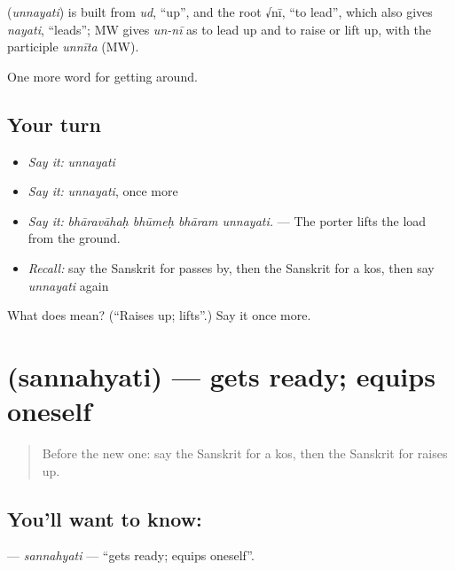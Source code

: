 \begin{cousinweb}
\textbf{} (\emph{unnayati}) is built from \emph{ud}, \textquotedblleft{}up\textquotedblright{}, and the root √nī, \textquotedblleft{}to lead\textquotedblright{}, which also gives \emph{nayati}, \textquotedblleft{}leads\textquotedblright{}; MW gives \emph{un-nī} as to lead up and to raise or lift up, with the participle \emph{unnīta} (MW).
\end{cousinweb}

\begin{grammarlens}[title={What you've built}]
One more word for getting around.
\end{grammarlens}

\subsection*{Your turn}
\begin{itemize}
\raggedright
  \item \emph{Say it:} \emph{unnayati}
  \item \emph{Say it:} \emph{unnayati}, once more
  \item \emph{Say it:} \emph{bhāravāhaḥ bhūmeḥ bhāram unnayati.} — The porter lifts the load from the ground.
  \item \emph{Recall:} say the Sanskrit for passes by, then the Sanskrit for a kos, then say \emph{unnayati} again
\end{itemize}

\begin{tcolorbox}[breakable,colback=teal!4,colframe=teal!35!black,title={Before you move on}]
What does  mean? (\textquotedblleft{}Raises up; lifts\textquotedblright{}.) Say it once more.
\end{tcolorbox}
\section[\texorpdfstring{\sk{सन्नह्यति} (sannahyati)}{सन्नह्यति (sannahyati)}]{ (sannahyati) — gets ready; equips oneself}

\label{lesson:SA-C413-sannahyati}



\begin{quote}
Before the new one: say the Sanskrit for a kos, then the Sanskrit for raises up.
\end{quote}

\subsection*{You'll want to know: }
\textbf{} — \emph{sannahyati} — \textquotedblleft{}gets ready; equips oneself\textquotedblright{}.

